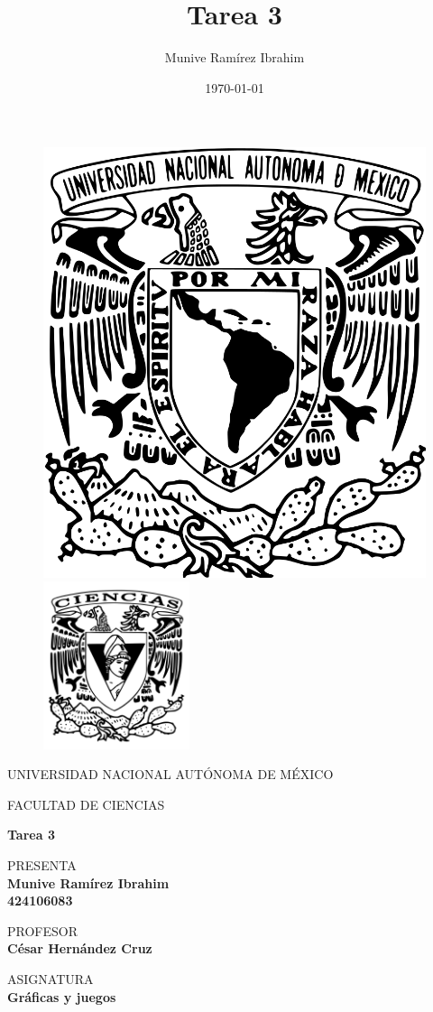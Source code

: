 
\title{Tarea 3}
\author{Munive Ramírez Ibrahim}
\date{\today}

\thispagestyle{empty}
\begin{figure}[ht]
	\includegraphics[width = 4 cm]{logo_unam.png}
	\endminipage
	\includegraphics[height = 4.9cm, width = 4 cm]{logo_ciencias.png}
	\endminipage
\end{figure}

\begin{center}
	\vspace{0.5cm}
	\LARGE
	UNIVERSIDAD NACIONAL AUTÓNOMA DE MÉXICO

	\vspace{0.5cm}
	\LARGE
	FACULTAD DE CIENCIAS

	\vspace{1.5cm}
	\Large
	\textbf{Tarea 3}

	\vspace{1cm}
	\normalsize
	PRESENTA \\
	\vspace{.3cm}
	\large
	\textbf{Munive Ramírez Ibrahim  \\ 424106083}

	\vspace{1cm}
	\normalsize
	PROFESOR \\
	\vspace{.3cm}
	\large
	\textbf{César Hernández Cruz}

	\vspace{1cm}
	\normalsize
	ASIGNATURA \\
	\vspace{.3cm}
	\large
	\textbf{Gráficas y juegos}

	\vspace{1cm}
\end{center}

\newpage
